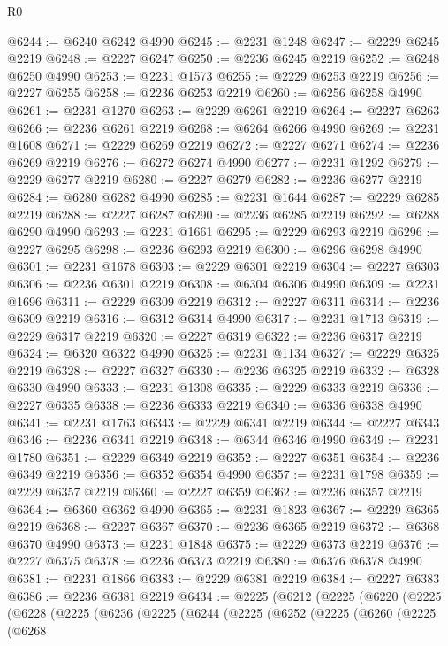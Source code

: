 \begin{lexlean}{R0}
\begin{coremodule}
@6244 := @6240 @6242 @4990
@6245 := @2231 @1248
@6247 := @2229 @6245 @2219
@6248 := @2227 @6247
@6250 := @2236 @6245 @2219
@6252 := @6248 @6250 @4990
@6253 := @2231 @1573
@6255 := @2229 @6253 @2219
@6256 := @2227 @6255
@6258 := @2236 @6253 @2219
@6260 := @6256 @6258 @4990
@6261 := @2231 @1270
@6263 := @2229 @6261 @2219
@6264 := @2227 @6263
@6266 := @2236 @6261 @2219
@6268 := @6264 @6266 @4990
@6269 := @2231 @1608
@6271 := @2229 @6269 @2219
@6272 := @2227 @6271
@6274 := @2236 @6269 @2219
@6276 := @6272 @6274 @4990
@6277 := @2231 @1292
@6279 := @2229 @6277 @2219
@6280 := @2227 @6279
@6282 := @2236 @6277 @2219
@6284 := @6280 @6282 @4990
@6285 := @2231 @1644
@6287 := @2229 @6285 @2219
@6288 := @2227 @6287
@6290 := @2236 @6285 @2219
@6292 := @6288 @6290 @4990
@6293 := @2231 @1661
@6295 := @2229 @6293 @2219
@6296 := @2227 @6295
@6298 := @2236 @6293 @2219
@6300 := @6296 @6298 @4990
@6301 := @2231 @1678
@6303 := @2229 @6301 @2219
@6304 := @2227 @6303
@6306 := @2236 @6301 @2219
@6308 := @6304 @6306 @4990
@6309 := @2231 @1696
@6311 := @2229 @6309 @2219
@6312 := @2227 @6311
@6314 := @2236 @6309 @2219
@6316 := @6312 @6314 @4990
@6317 := @2231 @1713
@6319 := @2229 @6317 @2219
@6320 := @2227 @6319
@6322 := @2236 @6317 @2219
@6324 := @6320 @6322 @4990
@6325 := @2231 @1134
@6327 := @2229 @6325 @2219
@6328 := @2227 @6327
@6330 := @2236 @6325 @2219
@6332 := @6328 @6330 @4990
@6333 := @2231 @1308
@6335 := @2229 @6333 @2219
@6336 := @2227 @6335
@6338 := @2236 @6333 @2219
@6340 := @6336 @6338 @4990
@6341 := @2231 @1763
@6343 := @2229 @6341 @2219
@6344 := @2227 @6343
@6346 := @2236 @6341 @2219
@6348 := @6344 @6346 @4990
@6349 := @2231 @1780
@6351 := @2229 @6349 @2219
@6352 := @2227 @6351
@6354 := @2236 @6349 @2219
@6356 := @6352 @6354 @4990
@6357 := @2231 @1798
@6359 := @2229 @6357 @2219
@6360 := @2227 @6359
@6362 := @2236 @6357 @2219
@6364 := @6360 @6362 @4990
@6365 := @2231 @1823
@6367 := @2229 @6365 @2219
@6368 := @2227 @6367
@6370 := @2236 @6365 @2219
@6372 := @6368 @6370 @4990
@6373 := @2231 @1848
@6375 := @2229 @6373 @2219
@6376 := @2227 @6375
@6378 := @2236 @6373 @2219
@6380 := @6376 @6378 @4990
@6381 := @2231 @1866
@6383 := @2229 @6381 @2219
@6384 := @2227 @6383
@6386 := @2236 @6381 @2219
@6434 := @2225
    (@6212
      (@2225
        (@6220
          (@2225
            (@6228
              (@2225
                (@6236
                  (@2225
                    (@6244
                      (@2225
                        (@6252
                          (@2225
                            (@6260
                              (@2225
                                (@6268

\end{coremodule}
\end{lexlean}
